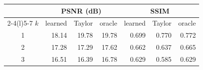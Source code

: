 \begin{tabular}{@{}crrrrrr@{}}
\toprule
 & \multicolumn{3}{c}{PSNR (dB)} & \multicolumn{3}{c}{SSIM} \\
\cmidrule(lr){2-4}\cmidrule(l){5-7}
$k$ & learned & Taylor & oracle & learned & Taylor & oracle \\
\midrule
1 & 18.14 & 19.78 & 19.78 & 0.699 & 0.770 & 0.772 \\
2 & 17.28 & 17.29 & 17.62 & 0.662 & 0.637 & 0.665 \\
3 & 16.51 & 16.39 & 16.78 & 0.629 & 0.585 & 0.629 \\
\bottomrule
\end{tabular}
